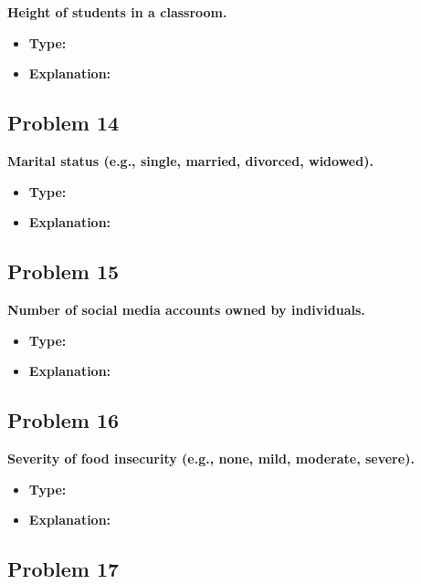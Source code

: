 \documentclass[
  letterpaper,
  DIV=11,
  numbers=noendperiod]{scrreprt}
\begin{document}
\textbf{Height of students in a classroom.}

\begin{itemize}
\item
  \textbf{Type:}
\item
  \textbf{Explanation:}
\end{itemize}

\subsection*{Problem 14}\label{problem-14}

\textbf{Marital status (e.g., single, married, divorced, widowed).}

\begin{itemize}
\item
  \textbf{Type:}
\item
  \textbf{Explanation:}
\end{itemize}

\subsection*{Problem 15}\label{problem-15}

\textbf{Number of social media accounts owned by individuals.}

\begin{itemize}
\item
  \textbf{Type:}
\item
  \textbf{Explanation:}
\end{itemize}

\subsection*{Problem 16}\label{problem-16}

\textbf{Severity of food insecurity (e.g., none, mild, moderate,
severe).}

\begin{itemize}
\item
  \textbf{Type:}
\item
  \textbf{Explanation:}
\end{itemize}

\subsection*{Problem 17}\label{problem-17}
\end{document}
